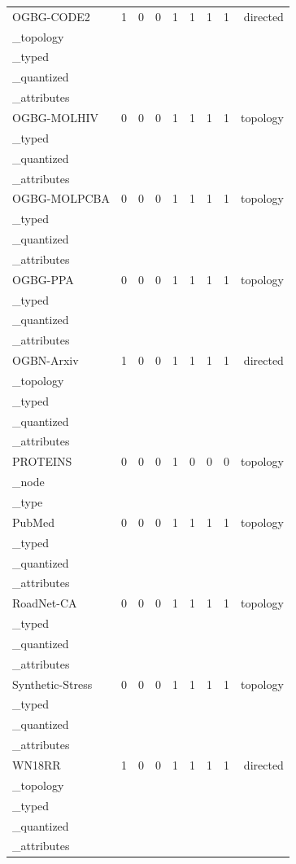 \begin{table}[t]
\begin{tabular}{lrrrrrrrr}
OGBG-CODE2 & 1 & 0 & 0 & 1 & 1 & 1 & 1 & directed\\_topology\\_typed\\_quantized\\_attributes \\
OGBG-MOLHIV & 0 & 0 & 0 & 1 & 1 & 1 & 1 & topology\\_typed\\_quantized\\_attributes \\
OGBG-MOLPCBA & 0 & 0 & 0 & 1 & 1 & 1 & 1 & topology\\_typed\\_quantized\\_attributes \\
OGBG-PPA & 0 & 0 & 0 & 1 & 1 & 1 & 1 & topology\\_typed\\_quantized\\_attributes \\
OGBN-Arxiv & 1 & 0 & 0 & 1 & 1 & 1 & 1 & directed\\_topology\\_typed\\_quantized\\_attributes \\
PROTEINS & 0 & 0 & 0 & 1 & 0 & 0 & 0 & topology\\_node\\_type \\
PubMed & 0 & 0 & 0 & 1 & 1 & 1 & 1 & topology\\_typed\\_quantized\\_attributes \\
RoadNet-CA & 0 & 0 & 0 & 1 & 1 & 1 & 1 & topology\\_typed\\_quantized\\_attributes \\
Synthetic-Stress & 0 & 0 & 0 & 1 & 1 & 1 & 1 & topology\\_typed\\_quantized\\_attributes \\
WN18RR & 1 & 0 & 0 & 1 & 1 & 1 & 1 & directed\\_topology\\_typed\\_quantized\\_attributes \\
\bottomrule
\end{tabular}
\end{table}
